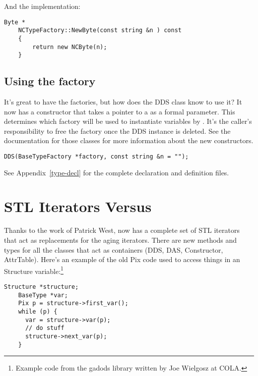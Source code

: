 \documentclass[justify]{dods-paper}
\begin{document}
And the implementation:

\begin{lstlisting}[caption={The Factory Implementation for NCByte}]
    Byte *
    NCTypeFactory::NewByte(const string &n ) const 
    { 
        return new NCByte(n);
    }
\end{lstlisting}

\subsection{Using the factory}

It's great to have the factories, but how does the DDS class know to
use it? It now has a constructor that takes a pointer to a
 as a formal parameter. This determines which
factory will be used to instantiate variables by .
It's the caller's responsibility to free the factory once the DDS
instance is deleted. See the documentation for those classes for more
information about the new constructors.

\begin{lstlisting}[caption={DDS Constructor}]
    DDS(BaseTypeFactory *factory, const string &n = "");
\end{lstlisting}

See Appendix~\ref{type-decl} for the complete declaration and
definition files.

\section{STL Iterators Versus }

Thanks to the work of Patrick West,  now has a complete
set of STL iterators that act as replacements for the aging 
iterators. There are new methods and types for all the classes that
act as containers (DDS, DAS, Constructor, AttrTable). Here's an
example of the old Pix code used to access things in an Structure
variable:\footnote{Example code from the gadods library written by Joe
  Wielgosz at COLA.}

\begin{lstlisting}[caption={Pix iterators}]
    Structure *structure;
    BaseType *var;
    Pix p = structure->first_var();
    while (p) {
      var = structure->var(p);      
      // do stuff
      structure->next_var(p);
    }
\end{lstlisting}
\end{document}
